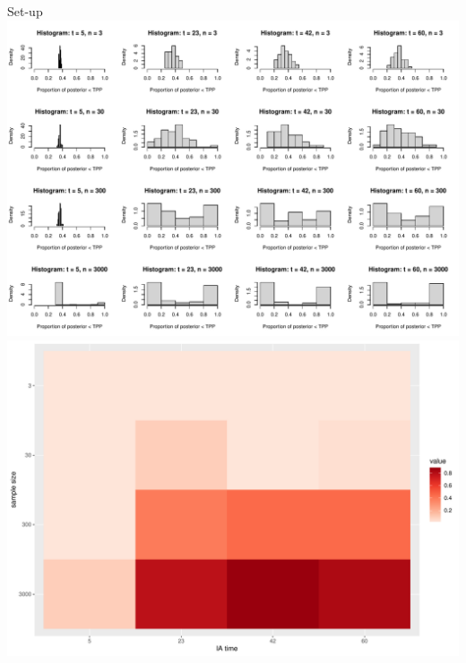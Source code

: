 \documentclass[
  ignorenonframetext,
]{beamer}
\begin{document}
\begin{frame}{Set-up}
\protect\hypertarget{set-up-3}{}
\includegraphics{DTEInterim_files/figure-beamer/unnamed-chunk-2-1.pdf}
\includegraphics{DTEInterim_files/figure-beamer/unnamed-chunk-2-2.pdf}
\end{frame}
\end{document}

